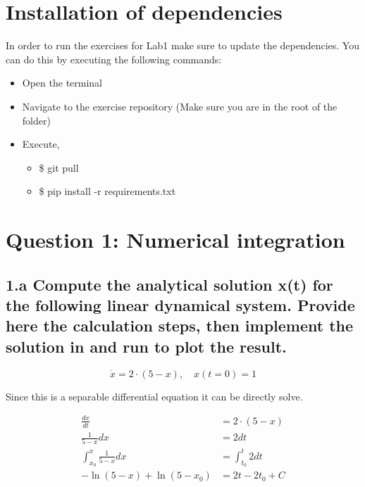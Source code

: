 \documentclass{cmc}
\begin{document}
\section*{Installation of dependencies}
\label{sec:inst-depend}

In order to run the exercises for Lab1 make sure to update the
dependencies.  You can do this by executing the following commands:

\begin{itemize}
	\item Open the terminal
	\item Navigate to the exercise repository (Make sure you are in the root of the folder)
	\item Execute,
	
  	\begin{itemize}
  		\item \$ git pull
  		\item \$ pip install -r requirements.txt
  	\end{itemize}
\end{itemize}

\newpage
\section*{Question 1: Numerical integration}

\subsection*{1.a Compute the analytical solution x(t) %
  for the following linear dynamical system. Provide here the calculation steps,
  then implement the solution in
  and run  to plot the result.}

\begin{equation}
  	\label{eq:ode-1}
  	\dot{x} = 2 \cdot (5 - x), \quad x(t=0)=1
\end{equation}

Since this is a separable differential equation it can be directly solve.

\begin{align*}
	\frac{dx}{dt} &= 2 \cdot (5-x) \\
	\frac{1}{5-x} dx &= 2 dt \\
	\int_{x_0}^x \frac{1}{5-x} dx &= \int_{t_0}^t 2 dt \\
	-\ln(5-x) + \ln(5-x_0) &= 2t - 2t_0 +C
\end{align*}
\end{document}
